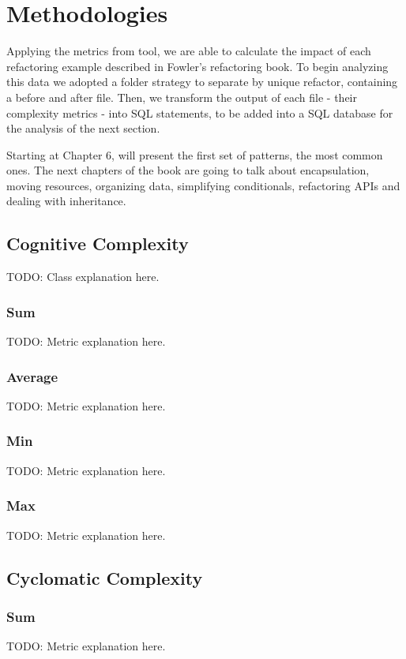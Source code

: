 \section{Methodologies}

Applying the metrics from \cite{article:mozilla} tool, we are able to calculate the impact of each refactoring example
described in Fowler's refactoring book. To begin analyzing this data we adopted a folder strategy to separate by unique refactor,
containing a before and after file. Then, we transform the output of each file - their complexity metrics - into SQL statements,
to be added into a SQL database for the analysis of the next section.

Starting at Chapter 6, \cite{book:refactoring} will present the first set of patterns, the most common ones.
The next chapters of the book are going to talk about encapsulation, moving resources, organizing data, simplifying conditionals,
refactoring APIs and dealing with inheritance.

\subsection{Cognitive Complexity}
TODO: Class explanation here.

\subsubsection{Sum}
TODO: Metric explanation here.

\subsubsection{Average}
TODO: Metric explanation here.

\subsubsection{Min}
TODO: Metric explanation here.

\subsubsection{Max}
TODO: Metric explanation here.

\subsection{Cyclomatic Complexity}

\subsubsection{Sum}
TODO: Metric explanation here.

